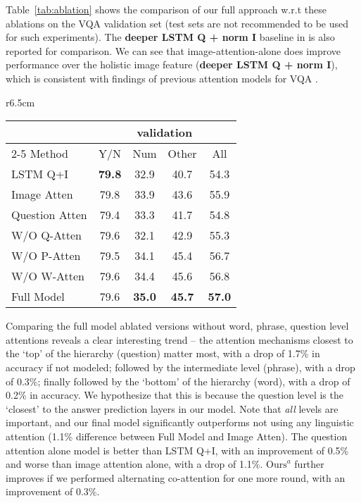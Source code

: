\documentclass{article}
\begin{document}
Table~\ref{tab:ablation} shows the comparison of our full approach w.r.t these ablations on the VQA validation set (test sets are not recommended to be used for such experiments). The \textbf{deeper LSTM Q + norm I} baseline in \citep{antol2015vqa} is also reported for comparison. We can see that image-attention-alone does improve performance over the holistic image feature (\textbf{deeper LSTM Q + norm I}), which is consistent with findings of previous attention models for VQA \cite{xiong2016dynamic, yang2015stacked}.

\begin{wraptable}{r}{6.5cm}\footnotesize
    \centering
    \label{tab:ablation}
    \begin{tabular}{l c c c c}
    \toprule
    \multicolumn{1}{c}{}   & \multicolumn{4}{c}{validation} \\
    \cmidrule{2-5}
    Method  & Y/N  & Num & Other & All \\
    \midrule	    
    LSTM Q+I & \textbf{79.8} & 32.9 & 40.7 & 54.3 \\
	Image Atten & 79.8& 33.9& 43.6& 55.9\\   	
	Question Atten & 79.4& 33.3& 41.7& 54.8\\
    W/O Q-Atten &79.6 &  32.1&  42.9&  55.3\\ 
    W/O P-Atten & 79.5& 34.1& 45.4& 56.7\\
    W/O W-Atten & 79.6& 34.4& 45.6& 56.8\\
   	Full Model & 79.6 &  \textbf{35.0} & \textbf{45.7} & \textbf{57.0}\\
    \bottomrule
    \end{tabular}       
\end{wraptable}
Comparing the full model \wrt ablated versions without {word, phrase, question} level attentions reveals a clear interesting trend -- the attention mechanisms closest to the `top' of the hierarchy (\ie question) matter most, with a drop of 1.7\% in accuracy if not modeled; followed by the intermediate level (\ie phrase), with a drop of 0.3\%; finally followed by the `bottom' of the hierarchy (\ie word), with a drop of 0.2\% in accuracy. We hypothesize that this is because the question level is the `closest' to the answer prediction layers in our model. Note that \emph{all} levels are important, and our final model significantly outperforms not using any linguistic attention (1.1\% difference between Full Model and Image Atten). The question attention alone model is better than LSTM Q+I, with an improvement of 0.5\% and worse than image attention alone, with a drop of 1.1\%. $\textrm{Ours}^a$ further improves if we performed alternating co-attention for one more round, with an improvement of 0.3\%.
\end{document}
